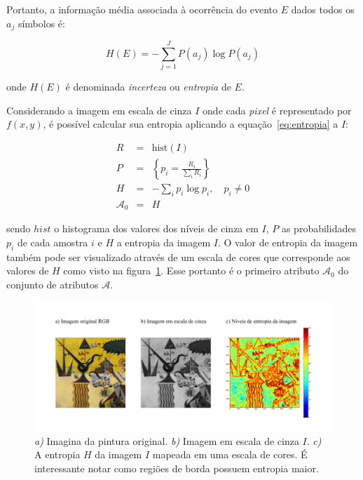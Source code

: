 Portanto, a informação média associada à ocorrência do evento $E$
dados todos os $a_j$ símbolos é:

\begin{equation}
  H(E) =  -\sum_{j=1}^J P(a_j) \log P(a_j)
  \label{eq:entropia}
\end{equation} 

\noindent onde $H(E)$ é denominada \emph{incerteza} ou \emph{entropia} de $E$.

Considerando a imagem em escala de cinza $I$ onde cada \textit{pixel} é
representado por $f(x,y)$, é possível calcular sua entropia aplicando
a equação~\ref{eq:entropia} a $I$:

\begin{eqnarray}
  R & = & \text{hist}(I) \\
  P & = & \left\{ p_i = \frac{R_i}{\sum_{i} R_i} \right\}\\
  H & = & -\sum_i p_i \log p_i, \,\,\,\,\,\, p_i \neq 0 \\
  \mathcal{A}_0 & = & H
\end{eqnarray}

\noindent sendo $hist$ o histograma dos valores dos níveis de cinza em
$I$, $P$ as probabilidades $p_i$ de cada amostra $i$ e $H$ a entropia
da imagem $I$. O valor de entropia da imagem também pode ser
visualizado através de um escala de cores que corresponde aos valores
de $H$ como visto na figura~\ref{fig:entrop}. Esse portanto é o
primeiro atributo $\mathcal{A}_0$ do conjunto de atributos
$\mathcal{A}$.

\begin{figure}[h!]
\begin{center}
      \caption{\textit{a)} Imagina da pintura original. \textit{b)}
        Imagem em escala de cinza $I$. \textit{c)} A entropia $H$ da
        imagem $I$ mapeada em uma escala de cores. É interessante
        notar como regiões de borda possuem entropia maior.}
        \label{fig:entrop}
        \includegraphics[scale=1]{figs/entrop}
        \fonteminha
\end{center}
\end{figure}

